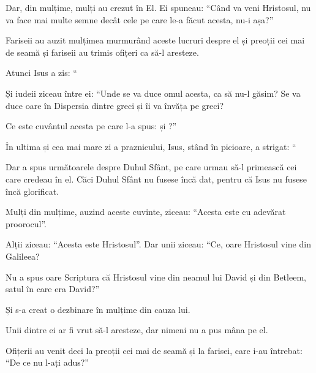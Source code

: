 {Dar, din mulțime, mulți au crezut în El. Ei spuneau: “Când va veni Hristosul, nu va face mai multe semne decât cele pe care le-a făcut acesta, nu-i așa?”

Fariseii au auzit mulțimea murmurând aceste lucruri despre el și preoții cei mai de seamă și fariseii au trimis ofițeri ca să-l aresteze.


\par }{\PP {}Atunci Isus a zis: “{}



\par }{\PP {}Și iudeii ziceau între ei: “Unde se va duce omul acesta, ca să nu-l găsim? Se va duce oare în Dispersia dintre greci și îi va învăța pe greci?

Ce este cuvântul acesta pe care l-a spus:
{} și
{}?”


\par }{\PP {}În ultima și cea mai mare zi a praznicului, Isus, stând în picioare, a strigat: “{}


Dar a spus următoarele despre Duhul Sfânt, pe care urmau să-l primească cei care credeau în el. Căci Duhul Sfânt nu fusese încă dat, pentru că Isus nu fusese încă glorificat.


\par }{\PP {}Mulți din mulțime, auzind aceste cuvinte, ziceau: “Acesta este cu adevărat proorocul”.

Alții ziceau: “Acesta este Hristosul”. Dar unii ziceau: “Ce, oare Hristosul vine din Galileea?

Nu a spus oare Scriptura că Hristosul vine din neamul lui David și din Betleem, satul în care era David?”

Și s-a creat o dezbinare în mulțime din cauza lui.

Unii dintre ei ar fi vrut să-l aresteze, dar nimeni nu a pus mâna pe el.

Ofițerii au venit deci la preoții cei mai de seamă și la farisei, care i-au întrebat: “De ce nu l-ați adus?”


}
